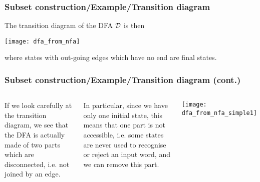 % 
\begin{frame}
\frametitle{Subset construction/Example/Transition diagram}

The transition diagram of the DFA \({\cal D}\) is then
\begin{center}
\texttt{[image: dfa\_from\_nfa]}
\end{center}
where states with out-going edges which have no end are final states.

\end{frame}

% 
\begin{frame}
\frametitle{Subset construction/Example/Transition diagram (cont.)}

\begin{columns}

   If we look carefully at the transition
  diagram, we see that the DFA is actually made of two parts which are
  disconnected, i.e. not joined by an edge.

  \bigskip

  In particular, since we have only one initial state, this means that
  one part is not accessible, i.e. some states are never used to
  recognise or reject an input word, and we can remove this part.

  \begin{center}
    \texttt{[image: dfa\_from\_nfa\_simple1]}
  \end{center}

\end{columns}

\end{frame}

